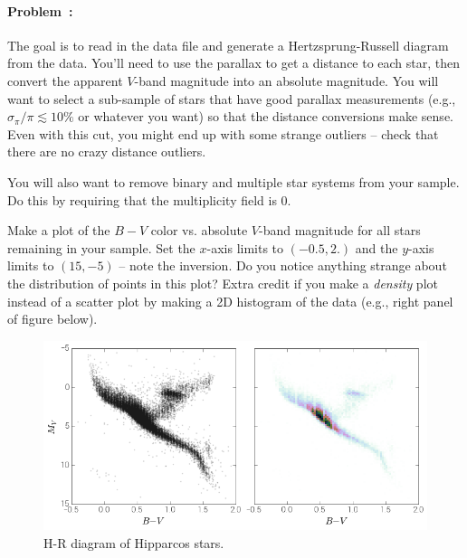 \documentclass[12pt,twoside]{article}
\newcommand{\problemname}{Problem}
\newcounter{problem}
\newenvironment{problem}{\paragraph{\problemname~\theproblem:}\refstepcounter{problem}}{}
\begin{document}
\begin{problem} 
The goal is to read in the data file and generate a Hertzsprung-Russell diagram from the data. You'll need to use the parallax to get a distance to each star, then convert the apparent $V$-band magnitude into an absolute magnitude. You will want to select a sub-sample of stars that have good parallax measurements (e.g., $\sigma_\pi / \pi \lesssim 10\%$ or whatever you want) so that the distance conversions make sense. Even with this cut, you might end up with some strange outliers -- check that there are no crazy distance outliers.

You will also want to remove binary and multiple star systems from your sample. Do this by requiring that the multiplicity field is 0.

Make a plot of the $B-V$ color vs. absolute $V$-band magnitude for all stars remaining in your sample. Set the $x$-axis limits to $(-0.5,2.)$ and the $y$-axis limits to $(15,-5)$ -- note the inversion. Do you notice anything strange about the distribution of points in this plot? Extra credit if you make a \emph{density} plot instead of a scatter plot by making a 2D histogram of the data (e.g., right panel of figure below).

\begin{figure}[!h]
\begin{center}
\includegraphics[width=\textwidth]{hr-diag.png}
\caption{ H-R diagram of Hipparcos stars. }\label{fig:hrdiag}
\end{center}
\end{figure}

\end{problem}
\end{document}

